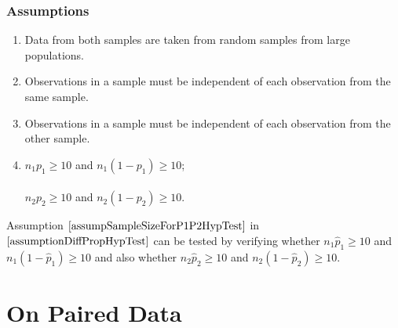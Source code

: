 \subsubsection{Assumptions}

\begin{assumptions}
\label{assumptionDiffPropHypTest}
\begin{enumerate}
\item Data from both samples are taken from random samples from large populations.
\item Observations in a sample must be independent of each observation from the same sample.
\item Observations in a sample must be independent of each observation from the other sample.
\item	$n_{1} p_{1} \geq 10$ and $n_{1} (1-p_{1}) \geq 10$; \label{assumpSampleSizeForP1P2HypTest}\\
	\hfill\\
	$n_{2} p_{2} \geq 10$ and $n_{2} (1-p_{2}) \geq 10$.
	\vspace{0.25cm}
\end{enumerate}
\end{assumptions}


\begin{nt}
Assumption $\ref{assumpSampleSizeForP1P2HypTest}$
in $\ref{assumptionDiffPropHypTest}$ can be tested by verifying whether
$n_{1} \hat{p}_{1} \geq 10$ and $n_{1} (1 - \hat{p}_{1}) \geq 10$
and also whether
$n_{2} \hat{p}_{2} \geq 10$ and $n_{2} (1 - \hat{p}_{2}) \geq 10$.
\end{nt}

















\section{On Paired Data}


